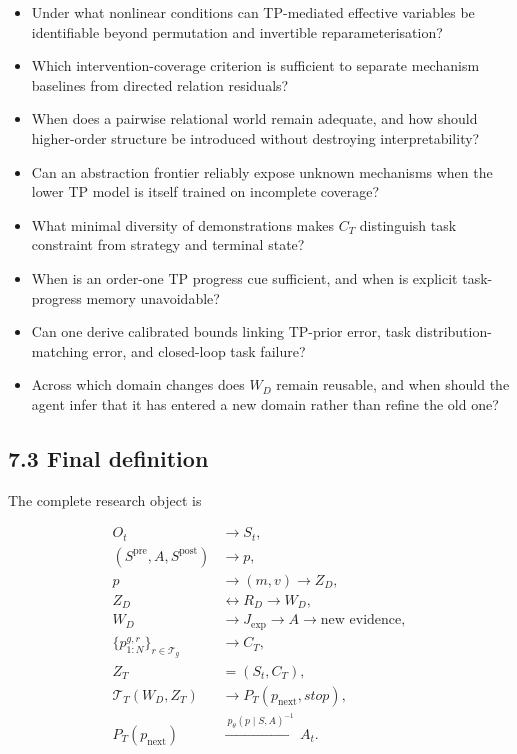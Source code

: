 \documentclass[11pt]{article}
\begin{document}
\begin{itemize}
\item Under what nonlinear conditions can TP-mediated effective variables be identifiable beyond permutation and invertible
reparameterisation?
\item Which intervention-coverage criterion is sufficient to separate mechanism baselines from directed relation residuals?
\item When does a pairwise relational world remain adequate, and how should higher-order structure be introduced without destroying
interpretability?
\item Can an abstraction frontier reliably expose unknown mechanisms when the lower TP model is itself trained on incomplete coverage?
\item What minimal diversity of demonstrations makes $C_T$ distinguish task constraint from strategy and terminal state?
\item When is an order-one TP progress cue sufficient, and when is explicit task-progress memory unavoidable?
\item Can one derive calibrated bounds linking TP-prior error, task distribution-matching error, and closed-loop task failure?
\item Across which domain changes does $W_D$ remain reusable, and when should the agent infer that it has entered a new domain rather
than refine the old one?
\end{itemize}

\subsection*{7.3 Final definition}

The complete research object is

\[
\boxed{
\begin{aligned}
O_t&\rightarrow S_t,\\
(S^{\mathrm{pre}},A,S^{\mathrm{post}})&\rightarrow p,\\
p&\rightarrow (m,v)\rightarrow Z_D,\\
Z_D&\leftrightarrow R_D\rightarrow W_D,\\
W_D&\rightarrow J_{\mathrm{exp}}\rightarrow A\rightarrow\text{new evidence},\\
\{p_{1:N}^{g,r}\}_{r\in\mathcal T_g}&\rightarrow C_T,\\
Z_T&=(S_t,C_T),\\
\mathcal T_T(W_D,Z_T)&\rightarrow P_T(p_{\mathrm{next}},stop),\\
P_T(p_{\mathrm{next}})&\xrightarrow{\ p_\theta(p\mid S,A)^{-1}\ } A_t.
\end{aligned}}
\]
\end{document}
